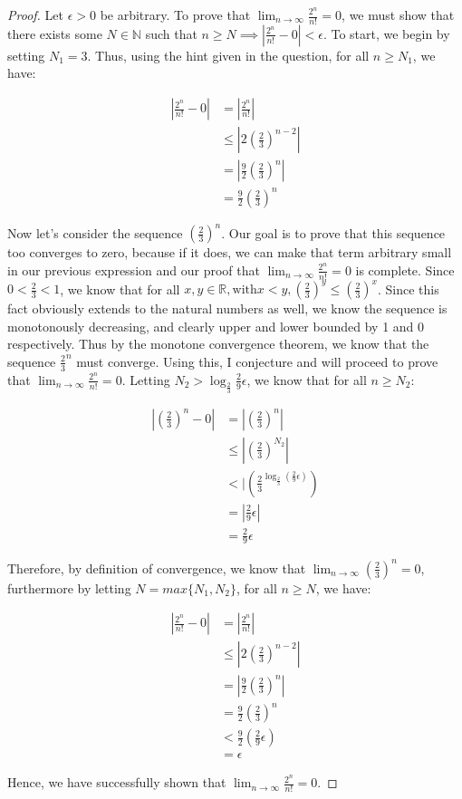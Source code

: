 \documentclass{article}
\begin{document}
\begin{proof}

	Let $\epsilon > 0$ be arbitrary. To prove that $\lim_{n\to\infty} \frac{2^n}{n!} = 0$, we must show that there exists some $N \in \mathbb{N}$ such that $n \ge N \implies | \frac{2^n}{n!} - 0 | < \epsilon$. To start, we begin by setting $N_1 = 3$. Thus, using the hint given in the question, for all $n \ge N_1$, we have:

	\begin{align*}
		| \frac{2^n}{n!} - 0 |
		&= | \frac{2^n}{n!} | \\
		&\le  | 2(\frac{2}{3})^{n-2} | \\
		&= |\frac{9}{2}(\frac{2}{3})^n| \\
		&= \frac{9}{2}(\frac{2}{3})^n
	\end{align*}
	
	Now let's consider the sequence $(\frac{2}{3})^{n}$. Our goal is to prove that this sequence too converges to zero, because if it does, we can make that term arbitrary small in our previous expression and our proof that $\lim_{n\to\infty} \frac{2^n}{n!} = 0$ is complete. Since $0 < \frac{2}{3} < 1$, we know that for all $x, y \in \mathbb{R}, \text{with} x < y, (\frac{2}{3})^y \le (\frac{2}{3})^{x}$. Since this fact obviously extends to the natural numbers as well, we know the sequence is monotonously decreasing, and clearly upper and lower bounded by 1 and 0 respectively. Thus by the monotone convergence theorem, we know that the sequence $\frac{2}{3}^{n}$ must converge. Using this, I conjecture and will proceed to prove that $\lim_{n\to\infty} \frac{2^n}{n!} = 0$. Letting $N_2 > \log_{\frac{2}{3}}{\frac{2}{9}\epsilon}$, we know that for all $n \ge N_2$:
	
	\begin{align*}
		|(\frac{2}{3})^n - 0 |
		&= |(\frac{2}{3})^n| \\
		&\le |(\frac{2}{3})^{N_2}| \\
		&< |(\frac{2}{3}^{\log_{\frac{2}{3}}{(\frac{2}{9}\epsilon)}}) \\
		&= |\frac{2}{9}\epsilon| \\
		&= \frac{2}{9}\epsilon
	\end{align*}
	
	Therefore, by definition of convergence, we know that $\lim_{n\to\infty}{(\frac{2}{3})^{n}} = 0$, furthermore by letting $N = max\{N_1, N_2\}$, for all $n \ge N$, we have:
	
	\begin{align*}
		| \frac{2^n}{n!} - 0 |
		&= | \frac{2^n}{n!} | \\
		&\le  | 2(\frac{2}{3})^{n-2} | \\
		&= |\frac{9}{2}(\frac{2}{3})^n| \\
		&= \frac{9}{2}(\frac{2}{3})^n \\
		&< \frac{9}{2}(\frac{2}{9}\epsilon) \\
		&= \epsilon
	\end{align*}
	
	Hence, we have successfully shown that $\lim_{n\to\infty} \frac{2^n}{n!} = 0$.
\end{proof}
\end{document}
